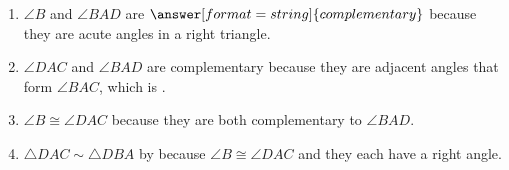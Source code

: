 \documentclass[nooutcomes,space]{ximera}
\begin{document}
\begin{problem}
\begin{enumerate}
\item $\angle B$ and $\angle BAD$ are $\answer[format=string]{complementary}$ because they are acute angles in a right triangle. 

\item $\angle DAC$ and $\angle BAD$ are complementary because they are adjacent angles that form $\angle BAC$, which is .  

\item $\angle B \cong \angle DAC$ because they are both complementary to $\angle BAD$.  

\item $\triangle DAC\sim \triangle DBA$ by  because $\angle B \cong \angle DAC$ and they each have a right angle.
\end{enumerate}

\end{problem}
\end{document}

